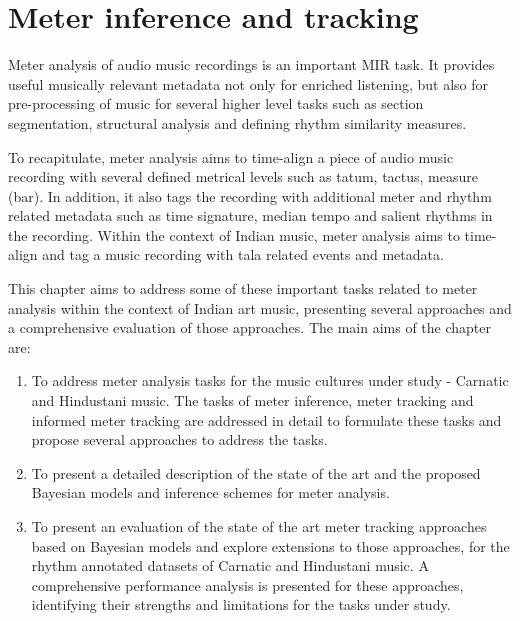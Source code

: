 \chapter{Meter inference and tracking}\label{chap:meterInfTrack}
\begin{epigraphs}
\end{epigraphs}
\noindent Meter analysis  of audio music recordings is an important \gls{MIR} task. It provides useful musically relevant metadata not only for enriched listening, but also for pre-processing of music for several higher level tasks such as section segmentation, structural analysis and defining rhythm similarity measures. 

To recapitulate, meter analysis aims to time-align a piece of audio music recording with several defined metrical levels such as tatum, tactus, measure (bar). In addition, it also tags the recording with additional meter and rhythm related metadata such as time signature, median tempo and salient rhythms in the recording. Within the context of Indian music, meter analysis aims to time-align and tag a music recording with \gls{tala} related events and metadata. 

This chapter aims to address some of these important tasks related to meter analysis within the context of Indian art music, presenting several approaches and a comprehensive evaluation of those approaches. The main aims of the chapter are: 
\begin{enumerate}[leftmargin=*]
 \item To address meter analysis tasks for the music cultures under study - Carnatic and Hindustani music. The tasks of meter inference, meter tracking and informed meter tracking are addressed in detail to formulate these tasks and propose several approaches to address the tasks. 
 \item To present a detailed description of the state of the art and the proposed Bayesian models and inference schemes for meter analysis. 
 \item To present an evaluation of the state of the art meter tracking approaches based on Bayesian models and explore extensions to those approaches, for the rhythm annotated datasets of Carnatic and Hindustani music. A comprehensive performance analysis is presented for these approaches, identifying their strengths and limitations for the tasks under study. 
\end{enumerate}
%
